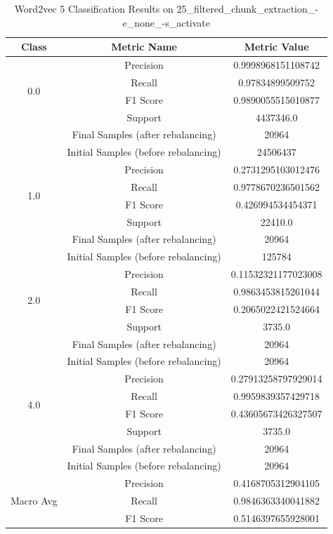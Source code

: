\begin{longtable}{|c|c|c|}
\caption{Word2vec 5 Classification Results on 25\_filtered\_chunk\_extraction\_-e\_none\_-s\_activate} \label{tab:25_filtered_chunk_extraction_-e_none_-s_activate_word2vec_5_classifiers_results} \\
\hline
Class & Metric Name & Metric Value \\
\hline
\multirow{4}{*}{0.0} & Precision & 0.9998968151108742 \\
 & Recall & 0.97834899509752 \\
 & F1 Score & 0.9890055515010877 \\
 & Support & 4437346.0 \\
 & Final Samples (after rebalancing) & 20964 \\
 & Initial Samples (before rebalancing) & 24506437 \\
\hline
\multirow{4}{*}{1.0} & Precision & 0.2731295103012476 \\
 & Recall & 0.9778670236501562 \\
 & F1 Score & 0.426994534454371 \\
 & Support & 22410.0 \\
 & Final Samples (after rebalancing) & 20964 \\
 & Initial Samples (before rebalancing) & 125784 \\
\hline
\multirow{4}{*}{2.0} & Precision & 0.11532321177023008 \\
 & Recall & 0.9863453815261044 \\
 & F1 Score & 0.2065022421524664 \\
 & Support & 3735.0 \\
 & Final Samples (after rebalancing) & 20964 \\
 & Initial Samples (before rebalancing) & 20964 \\
\hline
\multirow{4}{*}{4.0} & Precision & 0.27913258797929014 \\
 & Recall & 0.9959839357429718 \\
 & F1 Score & 0.43605673426327507 \\
 & Support & 3735.0 \\
 & Final Samples (after rebalancing) & 20964 \\
 & Initial Samples (before rebalancing) & 20964 \\
\hline
\multirow{4}{*}{Macro Avg} & Precision & 0.4168705312904105 \\
 & Recall & 0.9846363340041882 \\
 & F1 Score & 0.5146397655928001 \\

\end{longtable}
